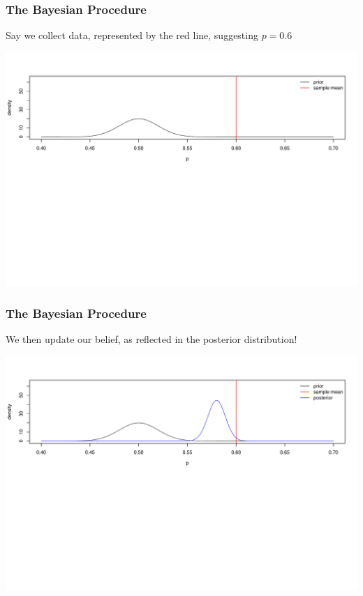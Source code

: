 \documentclass[handout]{beamer}
\newcommand{\blue}[1]{\textcolor{blue2}{#1}}
\begin{document}
\begin{frame}
\frametitle{The Bayesian Procedure}
Say we collect data, represented by the red line, suggesting $p=0.6$
\begin{center}
\includegraphics[width=\textwidth]{figure/bayes2.pdf} 
\end{center}

\end{frame}



\begin{frame}
\frametitle{The Bayesian Procedure}
We then \blue{update} our belief, as reflected in the posterior distribution!
\begin{center}
\includegraphics[width=\textwidth]{figure/bayes3.pdf} 
\end{center}

\end{frame}
\end{document}
